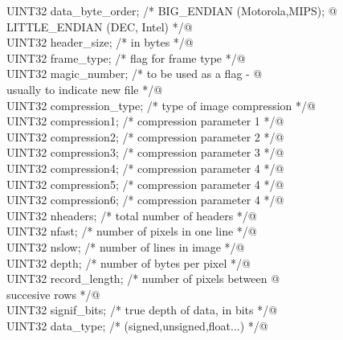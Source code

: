 \documentclass[10pt,a4paper,twoside,notitlepage]{article}
\begin{document}
\begin{flushleft}
\begin{list}{}{}
\mbox{}\verb@         UINT32        data_byte_order;  /* BIG_ENDIAN (Motorola,MIPS);  @\\
\mbox{}\verb@                                            LITTLE_ENDIAN (DEC, Intel) */@\\
\mbox{}\verb@         UINT32        header_size;      /* in bytes                     */@\\
\mbox{}\verb@         UINT32        frame_type;       /* flag for frame type */@\\
\mbox{}\verb@         UINT32        magic_number;     /* to be used as a flag - @\\
\mbox{}\verb@                                            usually  to indicate new file */@\\
\mbox{}\verb@         UINT32        compression_type; /* type of image compression    */@\\
\mbox{}\verb@         UINT32        compression1;     /* compression parameter 1 */@\\
\mbox{}\verb@         UINT32        compression2;     /* compression parameter 2 */@\\
\mbox{}\verb@         UINT32        compression3;     /* compression parameter 3 */@\\
\mbox{}\verb@         UINT32        compression4;     /* compression parameter 4 */@\\
\mbox{}\verb@         UINT32        compression5;     /* compression parameter 4 */@\\
\mbox{}\verb@         UINT32        compression6;     /* compression parameter 4 */@\\
\mbox{}\verb@         UINT32        nheaders;         /* total number of headers      */@\\
\mbox{}\verb@         UINT32        nfast;            /* number of pixels in one line */@\\
\mbox{}\verb@         UINT32        nslow;            /* number of lines in image     */@\\
\mbox{}\verb@         UINT32        depth;            /* number of bytes per pixel    */@\\
\mbox{}\verb@         UINT32        record_length;    /* number of pixels between @\\
\mbox{}\verb@                                            succesive rows */@\\
\mbox{}\verb@         UINT32        signif_bits;      /* true depth of data, in bits  */@\\
\mbox{}\verb@         UINT32        data_type;        /* (signed,unsigned,float...) */@\\

\end{list}
\end{flushleft}
\end{document}
